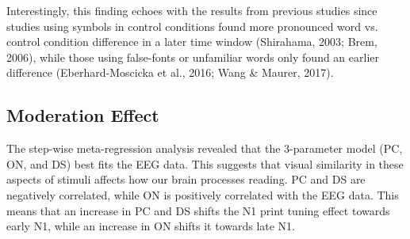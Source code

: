 \documentclass{article}
\begin{document}
Interestingly, this finding echoes with the results from previous studies since studies using symbols in control conditions found more pronounced word vs. control condition difference in a later time window (Shirahama, 2003; Brem, 2006), while those using false-fonts or unfamiliar words only found an earlier difference (Eberhard-Moscicka et al., 2016; Wang \& Maurer, 2017).

\subsection{Moderation Effect}

The step-wise meta-regression analysis revealed that the 3-parameter model (PC, ON, and DS) best fits the EEG data. This suggests that visual similarity in these aspects of stimuli affects how our brain processes reading. PC and DS are negatively correlated, while ON is positively correlated with the EEG data. This means that an increase in PC and DS shifts the N1 print tuning effect towards early N1, while an increase in ON shifts it towards late N1.
\end{document}
